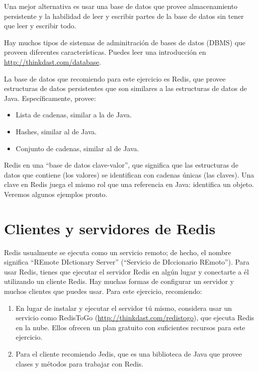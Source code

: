 \documentclass[12pt]{book}
\theoremstyle{exercise}
\begin{document}
Una mejor alternativa es usar una base de datos que provee almacenamiento
persistente y la habilidad de leer y escribir partes de la base de datos sin
tener que leer y escribir todo.


Hay muchos tipos de sistemas de adminitración de bases de datos (DBMS) que proveen
diferentes características. Puedes leer una introducción en
\url{http://thinkdast.com/database}.


La base de datos que recomiendo para este ejercicio es Redis, que provee
estructuras de datos persistentes que son similares a las estructuras de
datos de Java. Específicamente, provee:

\begin{itemize}

\item
  Lista de cadenas, similar a la  de Java.

\item
  Hashes, similar al  de Java.

\item
  Conjunto de cadenas, similar al  de Java.

\end{itemize}

Redis en una ``base de datos clave-valor'', que significa que las estructuras
de datos que contiene (los valores) se identifican con cadenas únicas (las
claves). Una clave en Redis juega el mismo rol que una referencia en Java:
identifica un objeto. Veremos algunos ejemplos pronto.



\section{Clientes y servidores de Redis}
\label{redis-clients-and-servers}


Redis usualmente se ejecuta como un servicio remoto; de hecho, el nombre
significa ``REmote DIctionary Server'' (``Servicio de DIccionario REmoto''). 
Para usar Redis, tienes que ejecutar el servidor Redis en algún lugar y conectarte
a él utilizando un cliente Redis. Hay muchas formas de configurar un servidor
y muchos clientes que puedes usar. Para este ejercicio, recomiendo:

\begin{enumerate}

\item
  En lugar de instalar y ejecutar el servidor tú mismo, considera usar un
  servicio como RedisToGo (\url{http://thinkdast.com/redistogo}), que ejecuta
  Redis en la nube. Ellos ofrecen un plan gratuito con suficientes recursos
  para este ejercicio.

\item
  Para el cliente recomiendo Jedis, que es una biblioteca de Java que
  provee clases y métodos para trabajar con Redis.

\end{enumerate}
\end{document}
